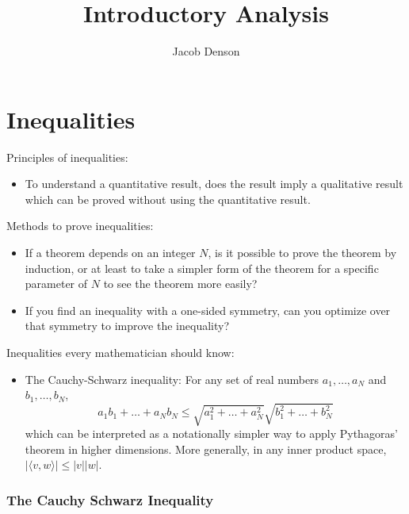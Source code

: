 

\title{Introductory Analysis}
\author{Jacob Denson}



\maketitle
\tableofcontents
{}

\part{Inequalities}

Principles of inequalities:

\begin{itemize}
    \item To understand a quantitative result, does the result imply a qualitative result which can be proved without using the quantitative result.
\end{itemize}

Methods to prove inequalities:

\begin{itemize}
    \item If a theorem depends on an integer $N$, is it possible to prove the theorem by induction, or at least to take a simpler form of the theorem for a specific parameter of $N$ to see the theorem more easily?

    \item If you find an inequality with a one-sided symmetry, can you optimize over that symmetry to improve the inequality?
\end{itemize}

Inequalities every mathematician should know:

\begin{itemize}
    \item The Cauchy-Schwarz inequality: For any set of real numbers $a_1, \dots, a_N$ and $b_1, \dots, b_N$,
    \[ a_1b_1 + \dots + a_Nb_N \leq \sqrt{a_1^2 + \dots + a_N^2} \sqrt{b_1^2 + \dots + b_N^2} \]
    which can be interpreted as a notationally simpler way to apply Pythagoras' theorem in higher dimensions. More generally, in any inner product space, $|\langle v, w \rangle| \leq |v| |w|$.
\end{itemize}

\section{The Cauchy Schwarz Inequality}

